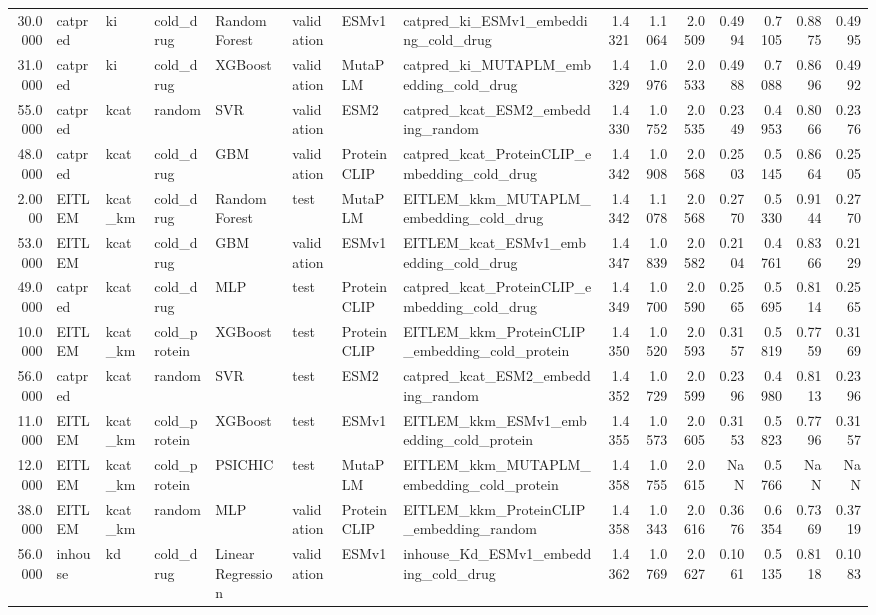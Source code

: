 \begin{tabular}{rlllllllrrrrrrr}
30.0000 & catpred & ki & cold_drug & Random Forest & validation & ESMv1 & catpred_ki_ESMv1_embedding_cold_drug & 1.4321 & 1.1064 & 2.0509 & 0.4994 & 0.7105 & 0.8875 & 0.4995 \\
31.0000 & catpred & ki & cold_drug & XGBoost & validation & MutaPLM & catpred_ki_MUTAPLM_embedding_cold_drug & 1.4329 & 1.0976 & 2.0533 & 0.4988 & 0.7088 & 0.8696 & 0.4992 \\
55.0000 & catpred & kcat & random & SVR & validation & ESM2 & catpred_kcat_ESM2_embedding_random & 1.4330 & 1.0752 & 2.0535 & 0.2349 & 0.4953 & 0.8066 & 0.2376 \\
48.0000 & catpred & kcat & cold_drug & GBM & validation & ProteinCLIP & catpred_kcat_ProteinCLIP_embedding_cold_drug & 1.4342 & 1.0908 & 2.0568 & 0.2503 & 0.5145 & 0.8664 & 0.2505 \\
2.0000 & EITLEM & kcat_km & cold_drug & Random Forest & test & MutaPLM & EITLEM_kkm_MUTAPLM_embedding_cold_drug & 1.4342 & 1.1078 & 2.0568 & 0.2770 & 0.5330 & 0.9144 & 0.2770 \\
53.0000 & EITLEM & kcat & cold_drug & GBM & validation & ESMv1 & EITLEM_kcat_ESMv1_embedding_cold_drug & 1.4347 & 1.0839 & 2.0582 & 0.2104 & 0.4761 & 0.8366 & 0.2129 \\
49.0000 & catpred & kcat & cold_drug & MLP & test & ProteinCLIP & catpred_kcat_ProteinCLIP_embedding_cold_drug & 1.4349 & 1.0700 & 2.0590 & 0.2565 & 0.5695 & 0.8114 & 0.2565 \\
10.0000 & EITLEM & kcat_km & cold_protein & XGBoost & test & ProteinCLIP & EITLEM_kkm_ProteinCLIP_embedding_cold_protein & 1.4350 & 1.0520 & 2.0593 & 0.3157 & 0.5819 & 0.7759 & 0.3169 \\
56.0000 & catpred & kcat & random & SVR & test & ESM2 & catpred_kcat_ESM2_embedding_random & 1.4352 & 1.0729 & 2.0599 & 0.2396 & 0.4980 & 0.8113 & 0.2396 \\
11.0000 & EITLEM & kcat_km & cold_protein & XGBoost & test & ESMv1 & EITLEM_kkm_ESMv1_embedding_cold_protein & 1.4355 & 1.0573 & 2.0605 & 0.3153 & 0.5823 & 0.7796 & 0.3157 \\
12.0000 & EITLEM & kcat_km & cold_protein & PSICHIC & test & MutaPLM & EITLEM_kkm_MUTAPLM_embedding_cold_protein & 1.4358 & 1.0755 & 2.0615 & NaN & 0.5766 & NaN & NaN \\
38.0000 & EITLEM & kcat_km & random & MLP & validation & ProteinCLIP & EITLEM_kkm_ProteinCLIP_embedding_random & 1.4358 & 1.0343 & 2.0616 & 0.3676 & 0.6354 & 0.7369 & 0.3719 \\
56.0000 & inhouse & kd & cold_drug & Linear Regression & validation & ESMv1 & inhouse_Kd_ESMv1_embedding_cold_drug & 1.4362 & 1.0769 & 2.0627 & 0.1061 & 0.5135 & 0.8118 & 0.1083 \\

\end{tabular}
